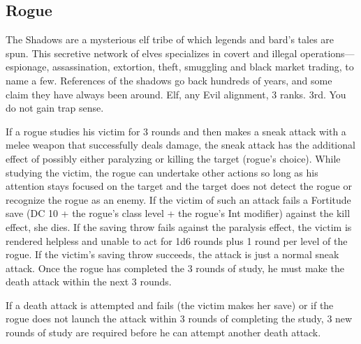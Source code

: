 \subsection{Rogue}
{The Shadows are a mysterious elf tribe of which legends and bard's tales are spun. This secretive network of elves specializes in covert and illegal operations---espionage, assassination, extortion, theft, smuggling and black market trading, to name a few. References of the shadows go back hundreds of years, and some claim they have always been around.}
{Elf, any Evil alignment,  3 ranks.}
{3rd.}
{You do not gain trap sense.}
{
	If a rogue studies his victim for 3 rounds and then makes a sneak attack with a melee weapon that successfully deals damage, the sneak attack has the additional effect of possibly either paralyzing or killing the target (rogue's choice). While studying the victim, the rogue can undertake other actions so long as his attention stays focused on the target and the target does not detect the rogue or recognize the rogue as an enemy. If the victim of such an attack fails a Fortitude save (DC 10 + \onehalf the rogue's class level + the rogue's Int modifier) against the kill effect, she dies. If the saving throw fails against the paralysis effect, the victim is rendered helpless and unable to act for 1d6 rounds plus 1 round per level of the rogue. If the victim's saving throw succeeds, the attack is just a normal sneak attack. Once the rogue has completed the 3 rounds of study, he must make the death attack within the next 3 rounds.

	If a death attack is attempted and fails (the victim makes her save) or if the rogue does not launch the attack within 3 rounds of completing the study, 3 new rounds of study are required before he can attempt another death attack.
}

